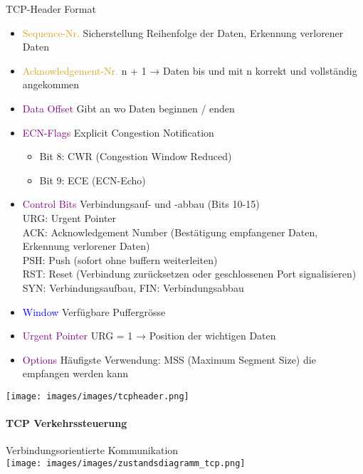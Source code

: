 \begin{concept}{TCP-Header Format}
    \begin{itemize}
        \item \textcolor{Goldenrod}{Sequence-Nr.} Sicherstellung Reihenfolge der Daten, Erkennung verlorener Daten
        \item \textcolor{Goldenrod}{Acknowledgement-Nr.} n + 1 → Daten bis und mit n korrekt und vollständig angekommen
        \item \textcolor{purple}{Data Offset} Gibt an wo Daten beginnen / enden
        \item \textcolor{purple}{ECN-Flags} Explicit Congestion Notification
        \begin{itemize}
            \item Bit 8: CWR (Congestion Window Reduced)
            \item Bit 9: ECE (ECN-Echo)
        \end{itemize}
        \item \textcolor{purple}{Control Bits} Verbindungsauf- und -abbau (Bits 10-15)\\
        URG: Urgent Pointer\\
        ACK: Acknowledgement Number (Bestätigung empfangener Daten, Erkennung verlorener Daten)\\
        PSH: Push (sofort ohne buffern weiterleiten)\\
        RST: Reset (Verbindung zurücksetzen oder geschlossenen Port signalisieren)\\
        SYN: Verbindungsaufbau,
        FIN: Verbindungsabbau
        \item \textcolor{blue}{Window} Verfügbare Puffergrösse 
        \item \textcolor{purple}{Urgent Pointer} URG = 1 → Position der wichtigen Daten
        \item \textcolor{purple}{Options} Häufigste Verwendung: MSS (Maximum Segment Size) die empfangen werden kann
    \end{itemize}
    \texttt{[image: images/images/tcpheader.png]}
\end{concept}

\paragraph{TCP Verkehrssteuerung}

\begin{concept}{Verbindungsorientierte Kommunikation}\\
    \texttt{[image: images/images/zustandsdiagramm\_tcp.png]}
\end{concept}

